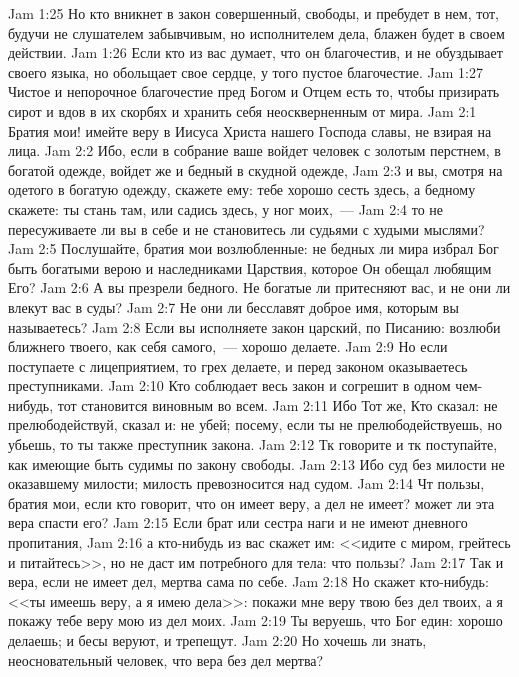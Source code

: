 \vs Jam 1:25 Но кто вникнет в закон совершенный,  свободы, и пребудет в нем, тот, будучи не слушателем забывчивым, но исполнителем дела, блажен будет в своем действии.
\vs Jam 1:26 Если кто из вас думает, что он благочестив, и не обуздывает своего языка, но обольщает свое сердце, у того пустое благочестие.
\vs Jam 1:27 Чистое и непорочное благочестие пред Богом и Отцем есть то, чтобы призирать сирот и вдов в их скорбях и хранить себя неоскверненным от мира.
\vs Jam 2:1 Братия мои! имейте веру в Иисуса Христа нашего Господа славы, не взирая на лица.
\vs Jam 2:2 Ибо, если в собрание ваше войдет человек с золотым перстнем, в богатой одежде, войдет же и бедный в скудной одежде,
\vs Jam 2:3 и вы, смотря на одетого в богатую одежду, скажете ему: тебе хорошо сесть здесь, а бедному скажете: ты стань там, или садись здесь, у ног моих,~---
\vs Jam 2:4 то не пересуживаете ли вы в себе и не становитесь ли судьями с худыми мыслями?
\vs Jam 2:5 Послушайте, братия мои возлюбленные: не бедных ли мира избрал Бог быть богатыми верою и наследниками Царствия, которое Он обещал любящим Его?
\vs Jam 2:6 А вы презрели бедного. Не богатые ли притесняют вас, и не они ли влекут вас в суды?
\vs Jam 2:7 Не они ли бесславят доброе имя, которым вы называетесь?
\vs Jam 2:8 Если вы исполняете закон царский, по Писанию: возлюби ближнего твоего, как себя самого,~--- хорошо делаете.
\vs Jam 2:9 Но если поступаете с лицеприятием, то грех делаете, и перед законом оказываетесь преступниками.
\vs Jam 2:10 Кто соблюдает весь закон и согрешит в одном чем-нибудь, тот становится виновным во всем.
\vs Jam 2:11 Ибо Тот же, Кто сказал: не прелюбодействуй, сказал и: не убей; посему, если ты не прелюбодействуешь, но убьешь, то ты также преступник закона.
\vs Jam 2:12 Тк говорите и тк поступайте, как имеющие быть судимы по закону свободы.
\vs Jam 2:13 Ибо суд без милости не оказавшему милости; милость превозносится над судом.
\rsbpar\vs Jam 2:14 Чт пользы, братия мои, если кто говорит, что он имеет веру, а дел не имеет? может ли эта вера спасти его?
\vs Jam 2:15 Если брат или сестра наги и не имеют дневного пропитания,
\vs Jam 2:16 а кто-нибудь из вас скажет им: <<идите с миром, грейтесь и питайтесь>>, но не даст им потребного для тела: что пользы?
\vs Jam 2:17 Так и вера, если не имеет дел, мертва сама по себе.
\vs Jam 2:18 Но скажет кто-нибудь: <<ты имеешь веру, а я имею дела>>: покажи мне веру твою без дел твоих, а я покажу тебе веру мою из дел моих.
\vs Jam 2:19 Ты веруешь, что Бог един: хорошо делаешь; и бесы веруют, и трепещут.
\vs Jam 2:20 Но хочешь ли знать, неосновательный человек, что вера без дел мертва?
